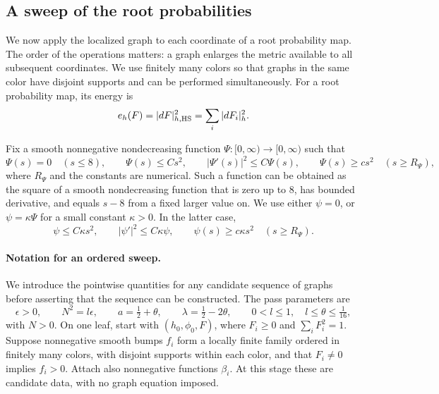 \subsection{A sweep of the root probabilities}

We now apply the localized graph to each coordinate of a root
probability map.  The order of the operations matters: a graph
enlarges the metric available to all subsequent coordinates.  We
use finitely many colors so that graphs in the same color have
disjoint supports and can be performed simultaneously.
For a root probability map, its energy is
\[
 e_h(F)=|dF|_{h,\mathrm{HS}}^2=\sum_i|dF_i|_h^2.
\]

Fix a smooth nonnegative nondecreasing function
\(\Psi:[0,\infty)\to[0,\infty)\) such that
\begin{equation}
 \Psi(s)=0\quad(s\le8),\qquad
 \Psi(s)\le Cs^2,\qquad |\Psi'(s)|^2\le C\Psi(s),\qquad
 \Psi(s)\ge cs^2\quad(s\ge R_\Psi),
 \label{eq:sweep-boost-profile}
\end{equation}
where \(R_\Psi\) and the constants are numerical.  Such a
function can be obtained as the square of a smooth
nondecreasing function that is zero up to \(8\), has bounded
derivative, and equals \(s-8\) from a fixed larger value on.
We use either \(\psi=0\), or \(\psi=\kappa\Psi\) for a small
constant \(\kappa>0\).  In the latter case,
\[
 \psi\le C\kappa s^2,\qquad
 |\psi'|^2\le C\kappa\psi,\qquad
 \psi(s)\ge c\kappa s^2\quad(s\ge R_\Psi).
\]

\paragraph{Notation for an ordered sweep.}
We introduce the pointwise quantities for any candidate sequence of
graphs before asserting that the sequence can be constructed.  The
pass parameters are
\begin{equation}
 \epsilon>0,\qquad N^2=l\epsilon,\qquad
 a=\tfrac12+\theta,\qquad \lambda=\tfrac12-2\theta,\qquad
 0<l\le1,\quad l\le\theta\le\tfrac1{16},
 \label{eq:sweep-parameters}
\end{equation}
with \(N>0\).  On one leaf, start with \((h_0,\phi_0,F)\), where
\(F_i\ge0\) and \(\sum_iF_i^2=1\).  Suppose nonnegative smooth
bumps \(f_i\) form a locally finite family ordered in finitely many
colors, with disjoint supports within each color, and that
\(F_i\ne0\) implies \(f_i>0\).  Attach also nonnegative functions
\(\beta_i\).  At this stage these are candidate data, with no graph
equation imposed.


